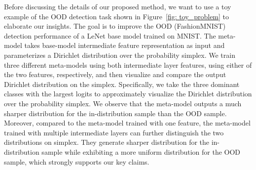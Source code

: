 Before discussing the details of our proposed method, we want to use a toy example of the OOD detection task shown in Figure~\ref{fig: toy_problem} to elaborate our insights. The goal is to improve the OOD (FashionMNIST) detection performance of a LeNet base model trained on MNIST. The meta-model takes base-model intermediate feature representation as input and parameterizes a Dirichlet distribution over the probability simplex. We train three different meta-models using both intermediate layer features, using either of the two features, respectively, and then visualize and compare the output Dirichlet distribution on the simplex. Specifically, we take the three dominant classes with the largest logits to approximately visualize the Dirichlet distribution over the probability simplex. We observe that the meta-model outputs a much sharper distribution for the in-distribution sample than the OOD sample. Moreover, compared to the meta-model trained with one feature, the meta-model trained with multiple intermediate layers can further distinguish the two distributions on simplex. They generate sharper distribution for the in-distribution sample while exhibiting a more uniform distribution for the OOD sample, which strongly supports our key claims. 





